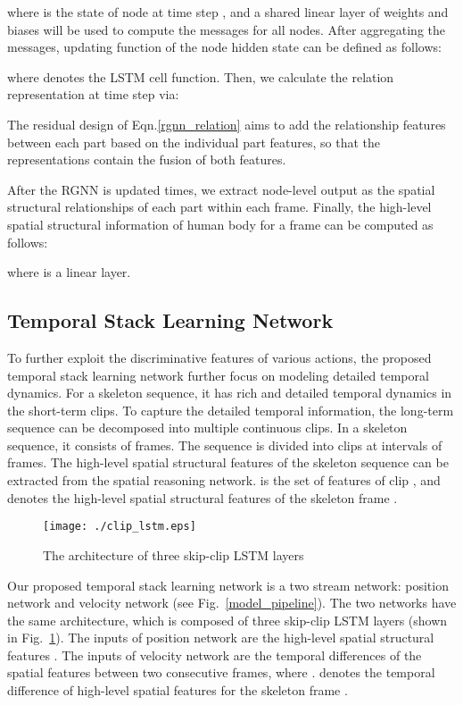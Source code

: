 \documentclass[runningheads]{llncs}
\begin{document}
where  is the state of node  at time step  , and a shared linear layer of weights  and biases  will be used to compute the messages for all nodes. After aggregating the messages, updating function of the node hidden state can be defined as follows:

where  denotes the LSTM cell function. Then, we calculate the relation representation  at time step  via:

The residual design of Eqn.\ref{rgnn_relation} aims to add the relationship features between each part based on the individual part features, so that the representations contain the fusion of both features.

After the RGNN is updated  times, we extract node-level output as the spatial structural relationships  of each part within each frame. Finally, the high-level spatial structural information  of human body for a frame can be computed as follows:

where  is a linear layer.

\subsection{Temporal Stack Learning Network}

To further exploit the discriminative features of various actions, the proposed temporal stack learning network further focus on modeling detailed temporal dynamics. For a skeleton sequence, it has rich and detailed temporal dynamics in the short-term clips. To capture the detailed temporal information, the long-term sequence can be decomposed into multiple continuous clips. In a skeleton sequence, it consists of  frames. The sequence is divided into  clips at intervals of  frames. The high-level spatial structural features  of the skeleton sequence can be extracted from the spatial reasoning network.  is the set of features of clip , and  denotes the high-level spatial structural features of the skeleton frame .

\begin{figure}[!b]
\centering
\texttt{[image: ./clip\_lstm.eps]}
\caption{The architecture of three skip-clip LSTM layers}
\label{clip_lstm}
\end{figure}

Our proposed temporal stack learning network is a two stream network: position network and velocity network (see Fig.~\ref{model_pipeline}). The two networks have the same architecture, which is composed of three skip-clip LSTM layers (shown in Fig.~\ref{clip_lstm}). The inputs of position network are the high-level spatial structural features . The inputs of velocity network are the temporal differences  of the spatial features between  two consecutive frames, where .  denotes the temporal difference of high-level spatial features for the skeleton frame .
\end{document}
